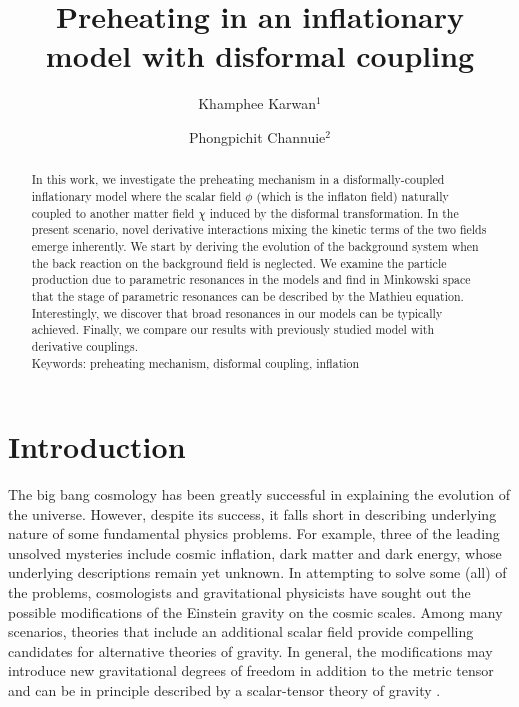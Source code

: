 \documentclass[aps,prd,amsmath,amssymb,preprintnumbers,onecolumn,11pt,nofootinbib]{revtex4}
\begin{document}
\title{\Large \color{CP3} Preheating in an inflationary model with disformal coupling}
\author{Khamphee Karwan$^{1}$}
\author{Phongpichit Channuie$^{2}$}

\begin{abstract}
In this work, we investigate the preheating mechanism in a disformally-coupled inflationary model where the scalar field $\phi$ (which is the inflaton field) naturally coupled to another matter field $\chi$ induced by the disformal transformation. In the present scenario, novel derivative interactions mixing the kinetic terms of the two fields emerge inherently. We start by deriving the evolution of the background system when the back reaction on the background field is neglected. We examine the particle production due to parametric resonances in the models and find in Minkowski space that the stage of parametric resonances can be described by the Mathieu equation. Interestingly, we discover that broad resonances in our models can be typically achieved. Finally, we compare our results with previously studied model with derivative couplings.
 \\[4mm]
{\footnotesize Keywords: preheating mechanism, disformal coupling, inflation}
\end{abstract}

\maketitle

\section{Introduction}
The big bang cosmology has been greatly successful in explaining the evolution of the universe. However, despite its success, it falls short in describing underlying nature of some fundamental physics problems. For example, three of the leading unsolved mysteries include cosmic inflation, dark matter and dark energy, whose underlying descriptions remain yet unknown. In attempting to solve some (all) of the problems, cosmologists and gravitational physicists have sought out the possible modifications of the Einstein gravity on the cosmic scales.  Among many scenarios, theories that include an additional scalar field provide compelling candidates for alternative theories of gravity. In general, the modifications may introduce new gravitational degrees of freedom in addition to the metric tensor and can be in principle described by a scalar-tensor theory of gravity \cite{Fujii2009}.
\end{document}
